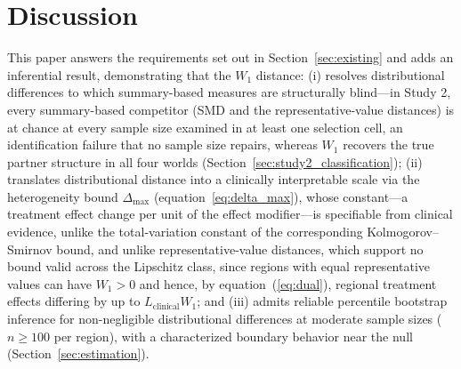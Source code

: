 \documentclass[AMA,Times1COL]{WileyNJDv5}
\begin{document}
\section{Discussion}\label{sec:discussion}

This paper answers the requirements set out in Section~\ref{sec:existing} and adds an inferential result, demonstrating that the $W_1$ distance: (i) resolves distributional differences to which summary-based measures are structurally blind---in Study 2, every summary-based competitor (SMD and the representative-value distances) is at chance at every sample size examined in at least one selection cell, an identification failure that no sample size repairs, whereas $W_1$ recovers the true partner structure in all four worlds (Section~\ref{sec:study2_classification}); (ii) translates distributional distance into a clinically interpretable scale via the heterogeneity bound \(\Delta_{\max}\) (equation~\ref{eq:delta_max}), whose constant---a treatment effect change per unit of the effect modifier---is specifiable from clinical evidence, unlike the total-variation constant of the corresponding Kolmogorov--Smirnov bound, and unlike representative-value distances, which support no bound valid across the Lipschitz class, since regions with equal representative values can have $W_1 > 0$ and hence, by equation~(\ref{eq:dual}), regional treatment effects differing by up to $L_{\text{clinical}} W_1$;\cite{komiyama2024} and (iii) admits reliable percentile bootstrap inference for non-negligible distributional differences at moderate sample sizes (\(n \geq 100\) per region), with a characterized boundary behavior near the null (Section~\ref{sec:estimation}).
\end{document}
